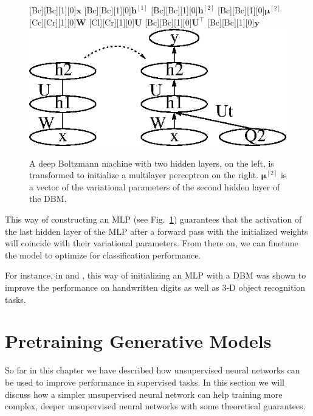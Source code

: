 \documentclass[dissertation,nocontribution]{aaltoseries}
\newcommand{\qlay}[1]{\left[#1\right]}
\newcommand{\vect}[1]{\mathbf{#1}}
\newcommand{\vects}[1]{\boldsymbol{#1}}
\newcommand{\matr}[1]{\mathbf{#1}}
\newcommand{\vh}[0]{\vect{h}}
\newcommand{\vx}[0]{\vect{x}}
\newcommand{\vy}[0]{\vect{y}}
\newcommand{\mW}[0]{\matr{W}}
\newcommand{\mU}[0]{\matr{U}}
\newcommand{\vmu}[0]{\vects{\mu}}
\begin{document}
\begin{figure}[t]
    \centering
    [Bc][Bc][1][0]{$\vx$}
    [Bc][Bc][1][0]{$\vh^{\qlay{1}}$}
    [Bc][Bc][1][0]{$\vh^{\qlay{2}}$}
    [Bc][Bc][1][0]{$\vmu^{\qlay{2}}$}
    [Cc][Cr][1][0]{$\mW$}
    [Cl][Cr][1][0]{$\mU$}
    [Bc][Bc][1][0]{$\mU^\top$}
    [Bc][Bc][1][0]{$\vy$}
    \includegraphics[width=0.75\columnwidth]{figures/dbm_mlp.eps}
    \caption{A deep Boltzmann machine with two hidden
    layers, on the left, is transformed to initialize a
    multilayer perceptron on the right. $\vmu^{\qlay{2}}$ is a
    vector of the variational parameters of the second
    hidden layer of the DBM.}
    \label{fig:dbm_mlp}
\end{figure}

This way of constructing an MLP (see Fig.~\ref{fig:dbm_mlp})
guarantees that the activation of the last hidden layer of
the MLP after a forward pass with the initialized weights
will coincide with their variational parameters. From there
on, we can finetune the model to optimize for classification
performance.

For instance, in \citep{Salakhutdinov2009a} and
\citep{Hinton2012}, this way of initializing an MLP with a
DBM was shown to improve the performance on handwritten
digits as well as 3-D object recognition tasks.





\section{Pretraining Generative Models}
\label{sec:pretrain_gen}


So far in this chapter we have described how 
unsupervised neural networks can be used to improve 
performance in supervised tasks. In this section we will
discuss how a simpler unsupervised neural network can help
training more complex, deeper unsupervised neural networks
with some theoretical guarantees.
\end{document}
